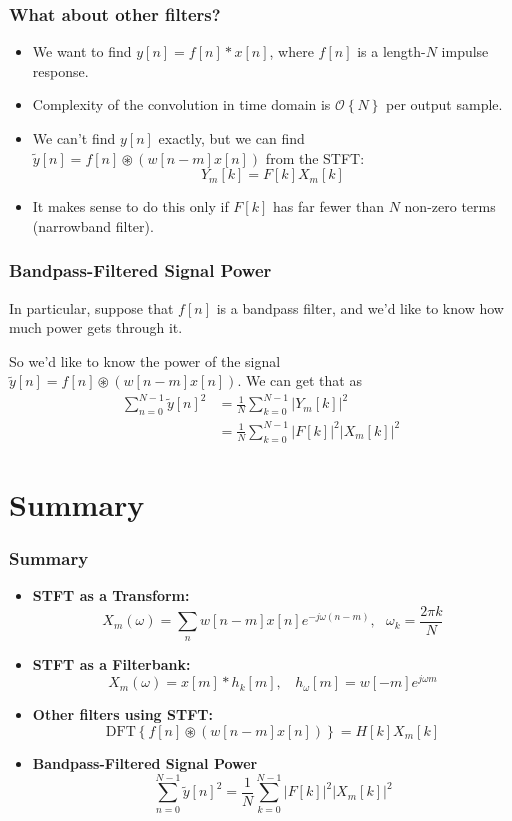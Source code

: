 \documentclass{beamer}
\begin{document}
\begin{frame}
  \frametitle{What about other filters?}

  \begin{itemize}
    \item 
      We want to find $y[n]=f[n]\ast x[n]$, where
      $f[n]$ is a length-$N$ impulse response.
    \item Complexity of the convolution in time domain is
      ${\mathcal{O}}\left\{N\right\}$ per output sample.
    \item We can't find $y[n]$ exactly, but we can find
      $\tilde{y}[n]=f[n]\circledast (w[n-m]x[n])$ from the STFT:
      \[
      Y_m[k] = F[k]X_m[k]
      \]
    \item It makes sense to do this only if $F[k]$ has far fewer than
      $N$ non-zero terms (narrowband filter).
  \end{itemize}
\end{frame}

\begin{frame}
  \frametitle{Bandpass-Filtered Signal Power}

  In particular, suppose that $f[n]$ is a bandpass filter, and we'd
  like to know how much power gets through it.

  So we'd like to know the power of the signal
  $\tilde{y}[n]=f[n]\circledast (w[n-m]x[n])$.  We can get that as
  \begin{align*}
    \sum_{n=0}^{N-1} \tilde{y}[n]^2 
    &= \frac{1}{N}\sum_{k=0}^{N-1} |Y_m[k]|^2\\
    &= \frac{1}{N}\sum_{k=0}^{N-1} |F[k]|^2 |X_m[k]|^2
  \end{align*}
\end{frame}

\section[Summary]{Summary}
\setcounter{subsection}{1}

\begin{frame}
  \frametitle{Summary}
  \begin{itemize}
  \item {\bf STFT as a Transform:}
    \[
    X_m(\omega)= \sum_n w[n-m]x[n]e^{-j\omega (n-m)},~~~\omega_k=\frac{2\pi k}{N}
    \]
  \item {\bf STFT as a Filterbank:}
    \[
    X_m(\omega) = x[m] \ast h_k[m],~~~~h_\omega[m] = w[-m]e^{j\omega m}
    \]
  \item {\bf Other filters using STFT:}
    \[
    \mbox{DFT}\left\{f[n] \circledast (w[n-m]x[n])\right\} = H[k]X_m[k]
    \]
  \item {\bf Bandpass-Filtered Signal Power}
    \[
    \sum_{n=0}^{N-1} \tilde{y}[n]^2 
    = \frac{1}{N}\sum_{k=0}^{N-1} |F[k]|^2 |X_m[k]|^2
    \]
  \end{itemize}
\end{frame}  
\end{document}
